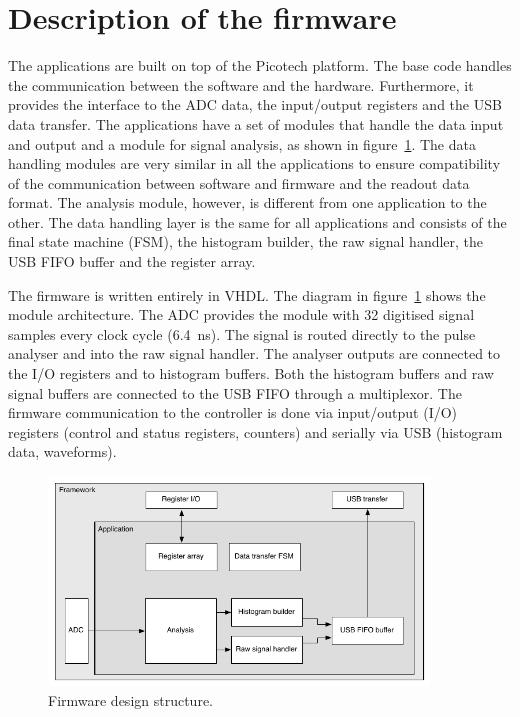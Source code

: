 \section{Description of the firmware}
The applications are built on top of the Picotech platform. The base code handles the communication between the software and the hardware. Furthermore, it provides the interface to the ADC data, the input/output registers and the USB data transfer. The applications have a set of modules that handle the data input and output and a module for signal analysis, as shown in figure~\ref{fig:application}. The data handling modules are very similar in all the applications to ensure compatibility of the communication between software and firmware and the readout data format. The analysis module, however, is different from one application to the other. The data handling layer is the same for all applications and consists of the final state machine (FSM), the histogram builder, the raw signal handler, the USB FIFO buffer and the register array.

The firmware is written entirely in VHDL. The diagram in figure~\ref{fig:application} shows the module architecture. The ADC provides the module with 32 digitised signal samples every clock cycle (6.4~ns). The signal is routed directly to the pulse analyser and into the raw signal handler. The analyser outputs are connected to the I/O registers and to histogram buffers. Both the histogram buffers and raw signal buffers are connected to the USB FIFO through a multiplexor. The firmware communication to the controller is done via input/output (I/O) registers (control and status registers, counters) and serially via USB (histogram data, waveforms). 


\begin{figure}[!t]
\centering
\includegraphics[width=0.9\textwidth]{05_current_monitoring/plots/application}
\caption{Firmware design structure.}
\label{fig:application}
\end{figure}


